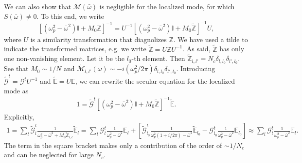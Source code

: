 \documentclass[aps,reprint]{revtex4-1}
\begin{document}
\begin{widetext}
We can also show that $\mathcal{M}(\bar{\omega})$ is negligible for the localized mode, for which $S(\bar{\omega})\neq0$. To this end, we write
\begin{equation}
\left[\left(\omega^2_p-\bar{\omega}^2\right)\mathbb{I}+M_0\mathbb{Z}\right]^{-1} = U^{-1}\left[\left(\omega^2_p-\bar{\omega}^2\right)\mathbb{I}+M_0\tilde{\mathbb{Z}}\right]^{-1}U,
\end{equation}
where $U$ is a similarity transformation that diagnolizes $\mathbb{Z}$. We have used a tilde to indicate the transformed matrices, e.g. we write $\tilde{\mathbb{Z}} = U\mathbb{Z}U^{-1}$. As said, $\tilde{\mathbb{Z}}$ has only one non-vanishing element. Let it be the $l_0$-th element. Then $\tilde{\mathbb{Z}}_{l,l'} = N_c\delta_{l,l_0}\delta_{l',l_0}$. See that $M_0\sim 1/N$ and $\tilde{\mathcal{M}}_{l,l'}(\bar{\omega})\sim -i(\omega^2_p/2\pi) \delta_{l,l_0}\delta_{l',l_0}$. Introducing $\tilde{\mathcal{G}}^{t}=\mathcal{G}^{t}U^{-1}$ and $\tilde{\mathbb{E}} = U\mathbb{E}$, we can rewrite the secular equation for the localized mode as 
\begin{eqnarray}
1 = \tilde{\mathcal{G}}^{t} \left[\left(\omega^2_p-\bar{\omega}^2\right)\mathbb{I}+M_0\tilde{\mathbb{Z}}\right]^{-1} \tilde{\mathbb{E}}.
\end{eqnarray}
Explicitly,
\begin{eqnarray}
1 = \sum_l \tilde{\mathcal{G}}^{t}_l \frac{1}{\omega^2_p-\bar{\omega}^2+M_0\tilde{\mathbb{Z}}_{l,l}}\tilde{\mathbb{E}}_{l} =  \sum_l \mathcal{G}^{t}_l \frac{1}{\omega^2_p-\bar{\omega}^2}\mathbb{E}_{l} + \left[\tilde{\mathcal{G}}^{t}_{l_0} \frac{1}{\omega^2_p(1+i/2\pi)-\bar{\omega}^2}\tilde{\mathbb{E}}_{l_0} - \mathcal{G}^{t}_{l_0}\frac{1}{\omega^2_p-\bar{\omega}^2}\mathbb{E}_{l_0}\right] \approx \sum_l \mathcal{G}^{t}_l \frac{1}{\omega^2_p-\bar{\omega}^2}\mathbb{E}_{l}. \nonumber
\end{eqnarray}
The term in the square bracket makes only a contribution of the order of $\sim 1/N_c$ and can be neglected for large $N_c$. 
\end{widetext}
\end{document}
